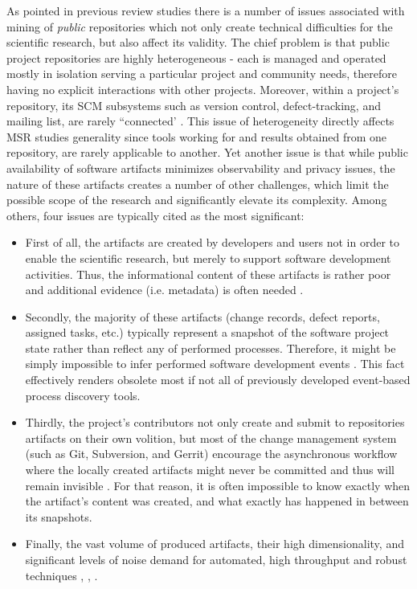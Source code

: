 As pointed in previous review studies \cite{citeulike:12550438} \cite{citeulike:7853299} \cite{citeulike:7465518} there
is a number of issues associated with mining of \textit{public} repositories which not only create technical difficulties for 
the scientific research, but also affect its validity. 
The chief problem is that public project repositories are highly heterogeneous - each is managed and operated 
mostly in isolation serving a particular project and community needs, therefore having no explicit interactions with 
other projects. 
Moreover, within a project's repository, its SCM subsystems such as version control, defect-tracking, and mailing list, 
are rarely ``connected'  \cite{citeulike:13058334}. 
This issue of heterogeneity directly affects MSR studies generality since tools working for and results obtained from 
one repository, are rarely applicable to another.
Yet another issue is that while public availability of software artifacts minimizes observability and privacy issues, 
the nature of these artifacts creates a number of other challenges, which limit the possible scope of the research and 
significantly elevate its complexity. Among others, four issues are typically cited as the most significant:
\begin{itemize}
 \item First of all, the artifacts are created by developers and users not in order to enable the scientific research,
but merely to support software development activities. Thus, the informational content of these artifacts is rather 
poor and additional evidence (i.e. metadata) is often needed \cite{citeulike:342840} \cite{citeulike:7954249} 
\cite{citeulike:7260421}.
 \item Secondly, the majority of these artifacts (change records, defect reports, assigned tasks, etc.) 
typically represent a snapshot of the software project state rather than reflect any of performed processes.
Therefore, it might be simply impossible to infer performed software development events \cite{citeulike:1296888}.
This fact effectively renders obsolete most if not all of previously developed event-based process discovery tools.
 \item Thirdly, the project's contributors not only create and submit to repositories artifacts on their own volition,
but most of the change management system (such as Git, Subversion, and Gerrit) encourage the asynchronous workflow 
where the locally created artifacts might never be committed and thus will remain invisible 
\cite{citeulike:2280690} \cite{citeulike:9037939}. 
For that reason, it is often impossible to know exactly when the artifact's content was created, and what exactly 
has happened in between its snapshots.
 \item Finally, the vast volume of produced artifacts, their high dimensionality, and significant levels of noise demand 
 for automated, high throughput and robust techniques 
 \cite{citeulike:12550438}, \cite{citeulike:7853299}, \cite{citeulike:4534888}.
 \end{itemize}

